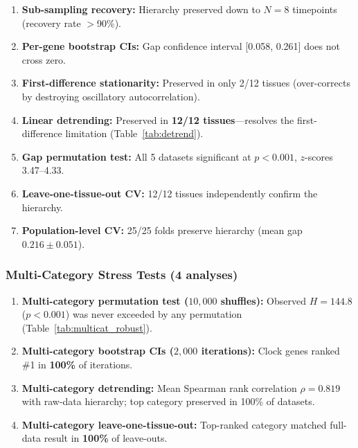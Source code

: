 \documentclass[11pt,a4paper]{article}
\begin{document}
\begin{enumerate}[noitemsep]
    \item \textbf{Sub-sampling recovery:} Hierarchy preserved down to $N=8$ timepoints (recovery rate $>$90\%).
    \item \textbf{Per-gene bootstrap CIs:} Gap confidence interval [0.058, 0.261] does not cross zero.
    \item \textbf{First-difference stationarity:} Preserved in only 2/12 tissues (over-corrects by destroying oscillatory autocorrelation).
    \item \textbf{Linear detrending:} Preserved in \textbf{12/12 tissues}---resolves the first-difference limitation (Table~\ref{tab:detrend}).
    \item \textbf{Gap permutation test:} All 5 datasets significant at $p < 0.001$, $z$-scores 3.47--4.33.
    \item \textbf{Leave-one-tissue-out CV:} 12/12 tissues independently confirm the hierarchy.
    \item \textbf{Population-level CV:} 25/25 folds preserve hierarchy (mean gap $0.216 \pm 0.051$).
\end{enumerate}

\subsubsection*{Multi-Category Stress Tests (4 analyses)}

\begin{enumerate}[noitemsep, start=8]
    \item \textbf{Multi-category permutation test ($10{,}000$ shuffles):} Observed $H = 144.8$ ($p < 0.001$) was never exceeded by any permutation (Table~\ref{tab:multicat_robust}).
    \item \textbf{Multi-category bootstrap CIs ($2{,}000$ iterations):} Clock genes ranked \#1 in \textbf{100\%} of iterations.
    \item \textbf{Multi-category detrending:} Mean Spearman rank correlation $\rho = 0.819$ with raw-data hierarchy; top category preserved in 100\% of datasets.
    \item \textbf{Multi-category leave-one-tissue-out:} Top-ranked category matched full-data result in \textbf{100\%} of leave-outs.
\end{enumerate}
\end{document}
